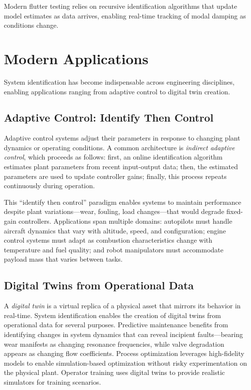 Modern flutter testing relies on recursive identification algorithms that update model estimates as data arrives, enabling real-time tracking of modal damping as conditions change.

\section{Modern Applications}
\label{sec:sysid_applications}

System identification has become indispensable across engineering disciplines, enabling applications ranging from adaptive control to digital twin creation.

\subsection{Adaptive Control: Identify Then Control}
\label{subsec:adaptive}

Adaptive control systems adjust their parameters in response to changing plant dynamics or operating conditions. A common architecture is \textit{indirect adaptive control}, which proceeds as follows: first, an online identification algorithm estimates plant parameters from recent input-output data; then, the estimated parameters are used to update controller gains; finally, this process repeats continuously during operation.

This ``identify then control'' paradigm enables systems to maintain performance despite plant variations---wear, fouling, load changes---that would degrade fixed-gain controllers. Applications span multiple domains: autopilots must handle aircraft dynamics that vary with altitude, speed, and configuration; engine control systems must adapt as combustion characteristics change with temperature and fuel quality; and robot manipulators must accommodate payload mass that varies between tasks.

\subsection{Digital Twins from Operational Data}
\label{subsec:digital_twins}

A \textit{digital twin} is a virtual replica of a physical asset that mirrors its behavior in real-time. System identification enables the creation of digital twins from operational data for several purposes. Predictive maintenance benefits from identifying changes in system dynamics that can reveal incipient faults---bearing wear manifests as changing resonance frequencies, while valve degradation appears as changing flow coefficients. Process optimization leverages high-fidelity models to enable simulation-based optimization without risky experimentation on the physical plant. Operator training uses digital twins to provide realistic simulators for training scenarios.

